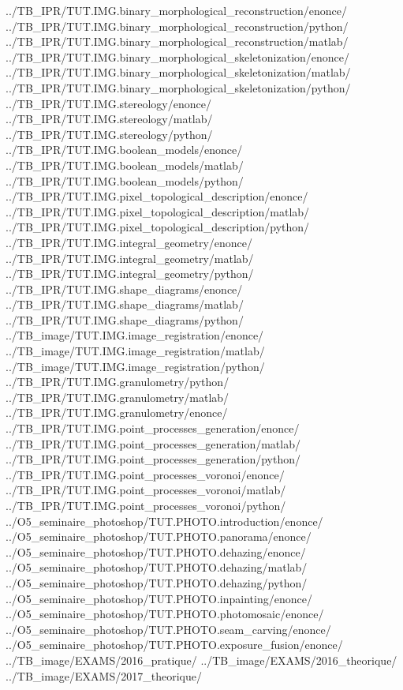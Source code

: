 {  {../TB_IPR/TUT.IMG.binary_morphological_reconstruction/enonce/}
  {../TB_IPR/TUT.IMG.binary_morphological_reconstruction/python/}
  {../TB_IPR/TUT.IMG.binary_morphological_reconstruction/matlab/}
  {../TB_IPR/TUT.IMG.binary_morphological_skeletonization/enonce/}
  {../TB_IPR/TUT.IMG.binary_morphological_skeletonization/matlab/}
  {../TB_IPR/TUT.IMG.binary_morphological_skeletonization/python/}
  {../TB_IPR/TUT.IMG.stereology/enonce/}
  {../TB_IPR/TUT.IMG.stereology/matlab/}
  {../TB_IPR/TUT.IMG.stereology/python/}
  {../TB_IPR/TUT.IMG.boolean_models/enonce/}
  {../TB_IPR/TUT.IMG.boolean_models/matlab/}
  {../TB_IPR/TUT.IMG.boolean_models/python/}
  {../TB_IPR/TUT.IMG.pixel_topological_description/enonce/}
  {../TB_IPR/TUT.IMG.pixel_topological_description/matlab/}
  {../TB_IPR/TUT.IMG.pixel_topological_description/python/}
  {../TB_IPR/TUT.IMG.integral_geometry/enonce/}
  {../TB_IPR/TUT.IMG.integral_geometry/matlab/}
  {../TB_IPR/TUT.IMG.integral_geometry/python/}
  {../TB_IPR/TUT.IMG.shape_diagrams/enonce/}
  {../TB_IPR/TUT.IMG.shape_diagrams/matlab/}
  {../TB_IPR/TUT.IMG.shape_diagrams/python/}
  {../TB_image/TUT.IMG.image_registration/enonce/}
  {../TB_image/TUT.IMG.image_registration/matlab/}
  {../TB_image/TUT.IMG.image_registration/python/}
  {../TB_IPR/TUT.IMG.granulometry/python/} 
  {../TB_IPR/TUT.IMG.granulometry/matlab/}
  {../TB_IPR/TUT.IMG.granulometry/enonce/}
  {../TB_IPR/TUT.IMG.point_processes_generation/enonce/}
  {../TB_IPR/TUT.IMG.point_processes_generation/matlab/}
  {../TB_IPR/TUT.IMG.point_processes_generation/python/}
  {../TB_IPR/TUT.IMG.point_processes_voronoi/enonce/}
  {../TB_IPR/TUT.IMG.point_processes_voronoi/matlab/}
  {../TB_IPR/TUT.IMG.point_processes_voronoi/python/}
  {../O5_seminaire_photoshop/TUT.PHOTO.introduction/enonce/}
  {../O5_seminaire_photoshop/TUT.PHOTO.panorama/enonce/}
  {../O5_seminaire_photoshop/TUT.PHOTO.dehazing/enonce/}
  {../O5_seminaire_photoshop/TUT.PHOTO.dehazing/matlab/}
  {../O5_seminaire_photoshop/TUT.PHOTO.dehazing/python/}
  {../O5_seminaire_photoshop/TUT.PHOTO.inpainting/enonce/}
  {../O5_seminaire_photoshop/TUT.PHOTO.photomosaic/enonce/}
  {../O5_seminaire_photoshop/TUT.PHOTO.seam_carving/enonce/}
  {../O5_seminaire_photoshop/TUT.PHOTO.exposure_fusion/enonce/}
  {../TB_image/EXAMS/2016_pratique/}  
  {../TB_image/EXAMS/2016_theorique/}
  {../TB_image/EXAMS/2017_theorique/}
}


\makeatletter
{}
\makeatother


